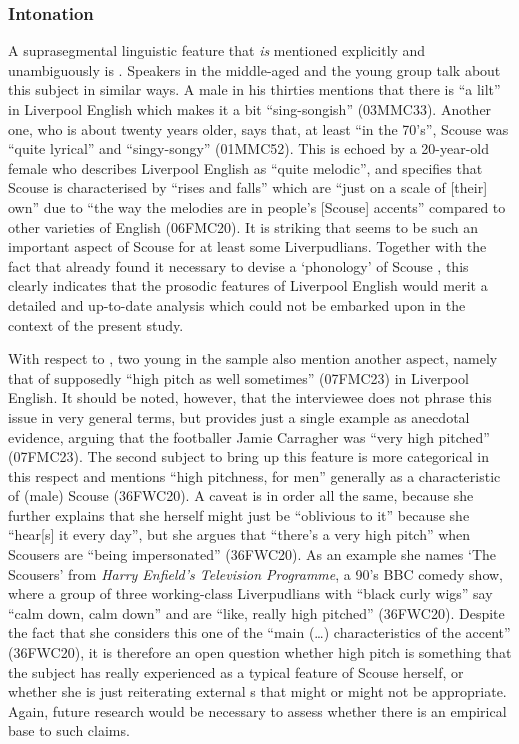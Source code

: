 \subsubsection{Intonation}

A suprasegmental linguistic feature that \emph{is} mentioned explicitly and unambiguously is .
Speakers in the middle-aged and the young group talk about this subject in similar ways.
A male in his thirties mentions that there is ``a lilt'' in Liverpool English which makes it a bit ``sing-songish'' (03MMC33).
Another one, who is about twenty years older, says that, at least ``in the 70's'', Scouse was ``quite lyrical'' and ``singy-songy'' (01MMC52).
This is echoed by a 20-year-old female who describes Liverpool English as ``quite melodic'', and specifies that Scouse  is characterised by ``rises and falls'' which are ``just on a scale of [their] own'' due to ``the way the melodies are in people's [Scouse] accents'' compared to other varieties of English (06FMC20).
It is striking that  seems to be such an important aspect of Scouse for at least some Liverpudlians.
Together with the fact that \textcite{knowles1973} already found it necessary to devise a `phonology' of Scouse , this clearly indicates that the prosodic features of Liverpool English would merit a detailed and up-to-date analysis which could not be embarked upon in the context of the present study.

With respect to , two young  in the sample also mention another aspect, namely that of supposedly ``high pitch as well sometimes'' (07FMC23) in Liverpool English.
It should be noted, however, that the interviewee does not phrase this issue in very general terms, but provides just a single example as anecdotal evidence, arguing that the footballer Jamie Carragher was ``very high pitched'' (07FMC23).
The second subject to bring up this feature is more categorical in this respect and mentions ``high pitchness, for men'' generally as a characteristic of (male) Scouse (36FWC20).
A caveat is in order all the same, because she further explains that she herself might just be ``oblivious to it'' because she ``hear[s] it every day'', but she argues that ``there's a very high pitch'' when Scousers are ``being impersonated'' (36FWC20).
As an example she names `The Scousers' from \emph{Harry Enfield's Television Programme}, a 90's BBC comedy show, where a group of three  working-class Liverpudlians with ``black curly wigs'' say ``calm down, calm down'' and are ``like, really high pitched'' (36FWC20).
Despite the fact that she considers this one of the ``main (\ldots) characteristics of the accent'' (36FWC20), it is therefore an open question whether high pitch is something that the subject has really experienced as a typical feature of Scouse herself, or whether she is just reiterating external s that might or might not be appropriate.
Again, future research would be necessary to assess whether there is an empirical base to such claims.

